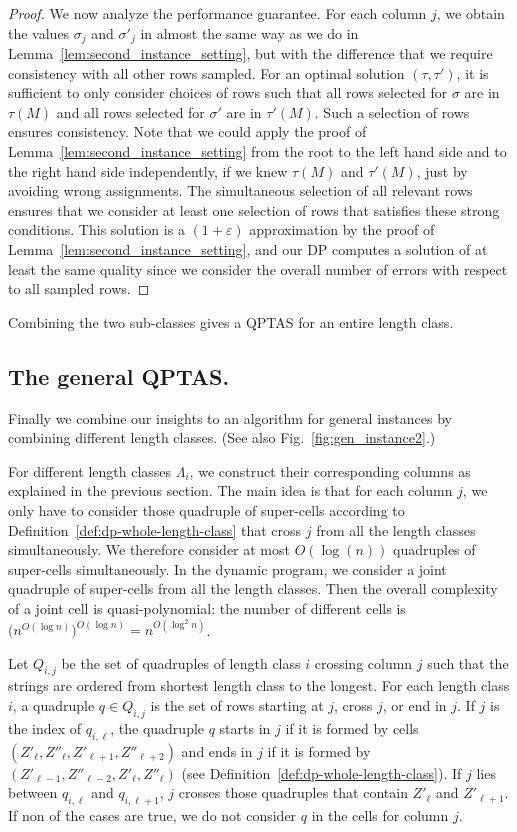 \begin{proof}
    We now analyze the performance guarantee. 
    For each column $j$, we obtain the values $\sigma_j$ and $\sigma'_j$ in almost the same way as we do in Lemma~\ref{lem:second_instance_setting}, but with the difference that we require consistency with all other rows sampled.
    For an optimal solution $(\tau,\tau')$, it is sufficient to only consider choices of rows such that all rows selected for $\sigma$ are in $\tau(M)$ and all rows selected for $\sigma'$ are in $\tau'(M)$.
    Such a selection of rows ensures consistency. 
    Note that we could apply the proof of Lemma~\ref{lem:second_instance_setting}  from the root to the left hand side and to the right hand side independently,
    if we knew $\tau(M)$ and $\tau'(M)$, just by avoiding wrong assignments.
    The simultaneous selection of all relevant rows ensures that we consider at least one selection of rows that satisfies these strong conditions.
    This solution is a $(1+\varepsilon)$ approximation by the proof of Lemma~\ref{lem:second_instance_setting}, and
    our DP computes a solution of at least the same quality since we consider the overall number of errors with respect to all sampled rows.
\end{proof}

Combining the two sub-classes gives a QPTAS for an entire length class.


\subsection{The general QPTAS.}\label{sec:generalQPTAS}
Finally we combine our insights to an algorithm for general instances by combining different length classes.
(See also Fig.~\ref{fig:gen_instance2}.) 

For different length classes $\Lambda_i$, we construct their corresponding columns as explained in the previous section. 
The main idea is that for each column $j$, we only have to consider those quadruple of super-cells according to Definition~\ref{def:dp-whole-length-class} that cross $j$ from all the length classes simultaneously.
We therefore consider at most $O(\log(n))$ quadruples of super-cells simultaneously. In the dynamic program, we consider a joint quadruple of super-cells from all the length classes.
Then the overall complexity of a joint cell is quasi-polynomial: the number of different cells is $\bigl(n^{O(\log n)}\bigr)^{O(\log n)} = n^{O(\log^2 n)}$.

Let $Q_{i,j}$ be the set of quadruples of length class $i$ crossing column $j$ such that the strings are ordered from shortest length class to the longest.
For each length class $i$, a quadruple $q \in Q_{i,j}$ is the set of rows starting at $j$, cross $j$, or end in $j$.
If $j$ is the index of $q_{i,\ell}$,
the quadruple $q$ starts in $j$ if it is formed by cells $(Z'_\ell,Z''_\ell,Z'_{\ell+1},Z''_{\ell+2})$ and ends in $j$ if it is formed by $(Z'_{\ell-1},Z''_{\ell-2},Z'_\ell,Z''_\ell)$ (see Definition~\ref{def:dp-whole-length-class}).
If $j$ lies between $q_{i,\ell}$ and $q_{i,\ell+1}$, $j$ crosses those quadruples that contain $Z'_\ell$ and $Z'_{\ell+1}$.
If non of the cases are true, we do not consider $q$ in the cells for column $j$.

